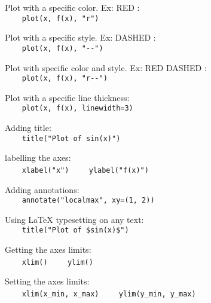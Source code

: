 Plot with a specific color. Ex: RED :\\
{\ex \lstinline|    plot(x, f(x), "r")|}

Plot with a specific style. Ex: DASHED :\\
{\ex \lstinline|    plot(x, f(x), "--")|}

Plot with specific color and style. Ex: RED DASHED :\\
{\ex \lstinline|    plot(x, f(x), "r--")|}

Plot with a specific line thickness:\\
{\ex \lstinline|    plot(x, f(x), linewidth=3)|}

Adding title:\\
{\ex \lstinline|    title("Plot of sin(x)")|}

labelling the axes:\\
{\ex \lstinline|    xlabel("x")|}
{\ex \lstinline|    ylabel("f(x)")|}

Adding annotations:\\
{\ex \lstinline|    annotate("localmax", xy=(1, 2))|}

Using LaTeX typesetting on any text:\\
{\ex \lstinline|    title("Plot of $sin(x)$")|}

Getting the axes limits:\\
{\ex \lstinline|    xlim()|}
{\ex \lstinline|    ylim()|}

Setting the axes limits:\\
{\ex \lstinline|    xlim(x_min, x_max)|}
{\ex \lstinline|    ylim(y_min, y_max)|}


